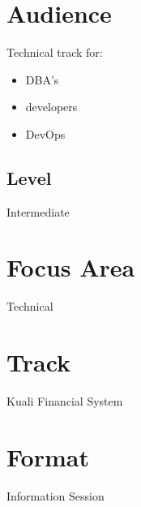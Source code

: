 \documentclass[12pt,notitlepage]{article}
\begin{document}
\section{Audience}
Technical track for: 
\begin{itemize}
\item DBA’s
\item developers
\item DevOps
\end{itemize}

\subsection{Level}
Intermediate

\section{Focus Area}
Technical

\section{Track}
Kuali Financial System


\section{Format}
Information Session
\end{document}
